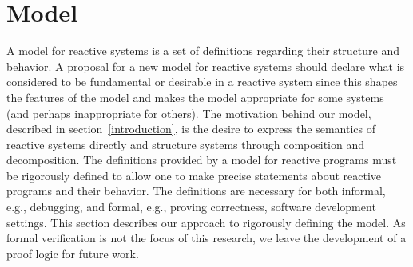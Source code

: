 \section{Model\label{model}}

A model for reactive systems is a set of definitions regarding their structure and behavior.
A proposal for a new model for reactive systems should declare what is considered to be fundamental or desirable in a reactive system since this shapes the features of the model and makes the model appropriate for some systems (and perhaps inappropriate for others).
The motivation behind our model, described in section~\ref{introduction}, is the desire to express the semantics of reactive systems directly and structure systems through composition and decomposition.
The definitions provided by a model for reactive programs must be rigorously defined to allow one to make precise statements about reactive programs and their behavior.
The definitions are necessary for both informal, e.g., debugging, and formal, e.g., proving correctness, software development settings.
This section describes our approach to rigorously defining the model.
As formal verification is not the focus of this research, we leave the development of a proof logic for future work.



